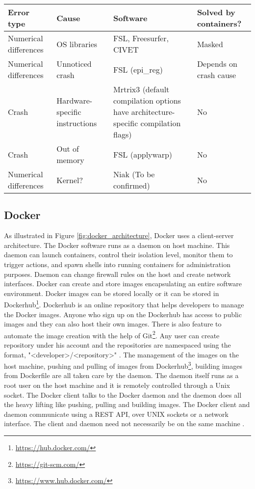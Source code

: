 \begin{center}
\tabulinesep=1.2mm
\begin{tabu} to \textwidth { | X[l] | X[l] | X[l] | X[l] |}
  \hline
  Error type & Cause & Software &  Solved by containers? \\
  \hline
  Numerical differences & OS libraries & FSL, Freesurfer, CIVET & Masked \\ 
  \hline
  Numerical differences & Unnoticed crash & FSL (epi\_reg) & Depends on crash cause \\ 
  \hline
  Crash & Hardware-specific instructions & Mrtrix3 (default compilation options have architecture-specific compilation flags) & No \\
  \hline
  Crash & Out of memory & FSL (applywarp) & No \\
  \hline
  Numerical differences & Kernel? & Niak (To be confirmed)  & No \\
  \hline
\end{tabu}
\label{tab:table_docker}
\end{center}

\subsection{Docker}
As illustrated in Figure \ref{fig:docker_architecture}, Docker uses a client-server architecture. The Docker software runs as a daemon on host machine. This daemon can launch containers, control their isolation level, monitor them to trigger actions, and spawn shells into running containers for administration purposes. Daemon can change firewall rules on the host and create network interfaces. Docker can create and store images encapsulating an entire software environment. Docker images can be stored locally or it can be stored in Dockerhub\footnote{\url{https://hub.docker.com/}}. Dockerhub is an online repository that helps developers to manage the Docker images. Anyone who sign up on the Dockerhub has access to public images and they can also host their own images. There is also feature to automate the image creation with the help of Git\footnote{\url{https://git-scm.com/}}. Any user can create repository under his account and the repositories are namespaced using the format, "\textless developer\textgreater/\textless repository\textgreater" \cite{7742298}. The management of the images on the host machine, pushing and pulling of images from Dockerhub\footnote{\url{https://www.hub.docker.com/}}, building images from Dockerfile are all taken care by the daemon. The daemon itself runs as a root user on the host machine and it is remotely controlled through a Unix socket. The Docker client talks to the Docker daemon and the daemon does all the heavy lifting like pushing, pulling and building images. The Docker client and daemon communicate using a REST API, over UNIX sockets or a network interface. The client and daemon need not necessarily be on the same machine \cite{docker-documentation}.

